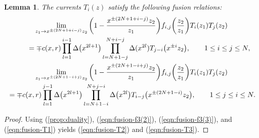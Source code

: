 \documentclass[10pt,a4paper]{amsart}
\numberwithin{equation}{section}
\newtheorem{Lemma}[Theorem]{Lemma}
\begin{document}
\begin{Lemma}
The currents $T_i(z)$ satisfy the following fusion relations:\vspace{-1ex}
\begin{gather}
\lim_{z_1 \to x^{\pm (2N+1+i-j)}z_2}
\bigg(1-\frac{x^{\pm (2N+1+i-j)}z_2}{z_1}\bigg)f_{i,j} \bigg(\frac{z_2}{z_1}\bigg)T_i(z_1)T_j(z_2)\notag
\\ \qquad
{}=\mp c(x,r)\prod_{l=1}^{i-1}\Delta\big(x^{2l+1}\big)
\prod_{l=N+1-j}^{N+i-j}\Delta(x^{2l})T_{j-i}\big(x^{\pm i}z_2\big),\qquad
1\leq i \leq j \leq N,
\label{eqn:fusion-T2}
\\
\lim_{z_1 \to x^{\pm (2N+1-i+j)}z_2}
\bigg(1-\frac{x^{\pm (2N+1-i+j)}z_2}{z_1}\bigg)
f_{i,j}\bigg(\frac{z_2}{z_1}\bigg)T_i(z_1)T_j(z_2)\notag
\\
{}=\mp c(x,r)\prod_{l=1}^{j-1}\Delta\big(x^{2l+1}\big)\prod_{l=N+1-i}^{N+j-i}
\Delta\big(x^{2l}\big)T_{i-j}\big(x^{\pm (2N+1-i)}z_2\big),\qquad
1\leq j \leq i \leq N.
\label{eqn:fusion-T3}
\end{gather}
\end{Lemma}

\begin{proof}
Using (\ref{prop:duality}), (\ref{eqn:fusion-f3(2)}), (\ref{eqn:fusion-f3(3)}),
and (\ref{eqn:fusion-T1}) yields (\ref{eqn:fusion-T2}) and (\ref{eqn:fusion-T3}).
\end{proof}
\end{document}
